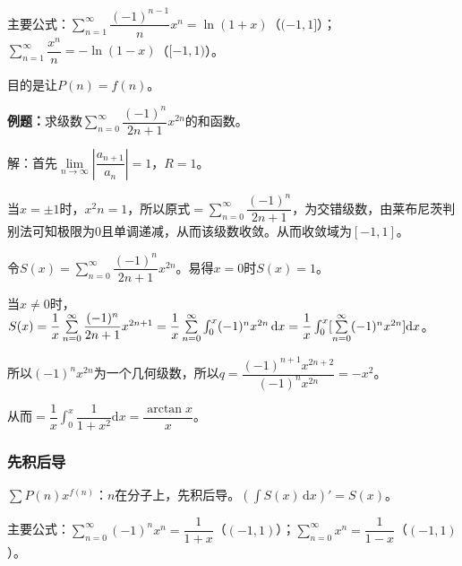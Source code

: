 主要公式：$\sum\limits_{n=1}^\infty\dfrac{(-1)^{n-1}}{n}x^n=\ln(1+x)$（$(-1,1]$）；$\sum\limits_{n=1}^\infty\dfrac{x^n}{n}=-\ln(1-x)$（$[-1,1)$）。

目的是让$P(n)=f(n)$。






\textbf{例题：}求级数$\sum\limits_{n=0}^\infty\dfrac{(-1)^n}{2n+1}x^{2n}$的和函数。

解：首先$\lim\limits_{n\to\infty}\left\vert\dfrac{a_{n+1}}{a_n}\right\vert=1$，$R=1$。

当$x=\pm1$时，$x^2n=1$，所以原式$=\sum\limits_{n=0}^\infty\dfrac{(-1)^n}{2n+1}$，为交错级数，由莱布尼茨判别法可知极限为0且单调递减，从而该级数收敛。从而收敛域为$[-1,1]$。

令$S(x)=\sum\limits_{n=0}^\infty\dfrac{(-1)^n}{2n+1}x^{2n}$。易得$x=0$时$S(x)=1$。

当$x\neq0$时，$S(x)=\dfrac{1}{x}\sum\limits_{n=0}^\infty\dfrac{(-1)^n}{2n+1}x^{2n+1}=\dfrac{1}{x}\sum\limits_{n=0}^\infty\int_0^x(-1)^nx^{2n}\,\textrm{d}x\\=\dfrac{1}{x}\int_0^x[\sum\limits_{n=0}^\infty(-1)^nx^{2n}]\textrm{d}x$。

所以$(-1)^nx^{2n}$为一个几何级数，所以$q=\dfrac{(-1)^{n+1}x^{2n+2}}{(-1)^nx^{2n}}=-x^2$。

从而$=\displaystyle{\dfrac{1}{x}\int_0^x\dfrac{1}{1+x^2}\textrm{d}x=\dfrac{\arctan x}{x}}$。

\subsubsection{先积后导}

$\sum P(n)x^{f(n)}$：$n$在分子上，先积后导。$(\int S(x)\,\textrm{d}x)'=S(x)$。

主要公式：$\sum\limits_{n=0}^\infty(-1)^nx^n=\dfrac{1}{1+x}$（$(-1,1)$）；$\sum\limits_{n=0}^\infty x^n=\dfrac{1}{1-x}$（$(-1,1)$）。

